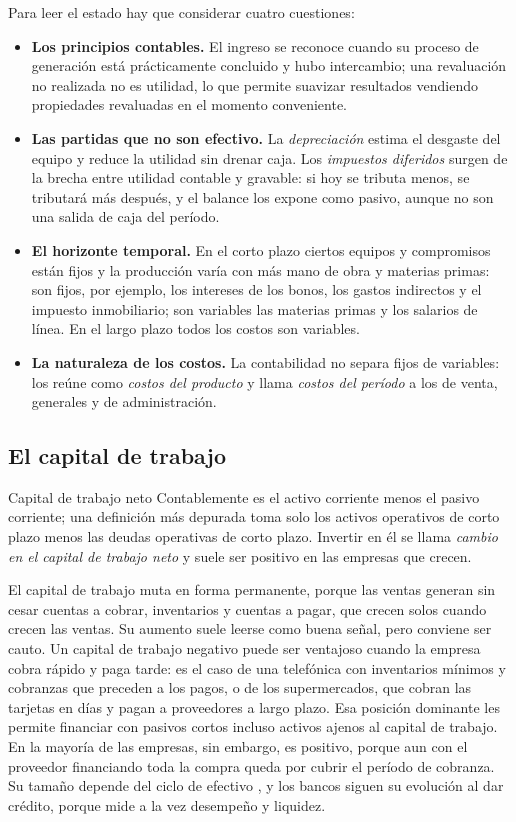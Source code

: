 Para leer el estado hay que considerar cuatro cuestiones:
\begin{itemize}
\item \textbf{Los principios contables.} El ingreso se reconoce cuando su proceso de generación está prácticamente concluido y hubo intercambio; una revaluación no realizada no es utilidad, lo que permite suavizar resultados vendiendo propiedades revaluadas en el momento conveniente.
\item \textbf{Las partidas que no son efectivo.} La \emph{depreciación} estima el desgaste del equipo y reduce la utilidad sin drenar caja. Los \emph{impuestos diferidos} surgen de la brecha entre utilidad contable y gravable: si hoy se tributa menos, se tributará más después, y el balance los expone como pasivo, aunque no son una salida de caja del período.
\item \textbf{El horizonte temporal.} En el corto plazo ciertos equipos y compromisos están fijos y la producción varía con más mano de obra y materias primas: son fijos, por ejemplo, los intereses de los bonos, los gastos indirectos y el impuesto inmobiliario; son variables las materias primas y los salarios de línea. En el largo plazo todos los costos son variables.
\item \textbf{La naturaleza de los costos.} La contabilidad no separa fijos de variables: los reúne como \emph{costos del producto} y llama \emph{costos del período} a los de venta, generales y de administración.
\end{itemize}

\subsection{El capital de trabajo}

\begin{definicion}{Capital de trabajo neto}
Contablemente es el activo corriente menos el pasivo corriente; una definición más depurada toma solo los activos operativos de corto plazo menos las deudas operativas de corto plazo. Invertir en él se llama \emph{cambio en el capital de trabajo neto} y suele ser positivo en las empresas que crecen.
\end{definicion}

El capital de trabajo muta en forma permanente, porque las ventas generan sin cesar cuentas a cobrar, inventarios y cuentas a pagar, que crecen solos cuando crecen las ventas. Su aumento suele leerse como buena señal, pero conviene ser cauto. Un capital de trabajo negativo puede ser ventajoso cuando la empresa cobra rápido y paga tarde: es el caso de una telefónica con inventarios mínimos y cobranzas que preceden a los pagos, o de los supermercados, que cobran las tarjetas en días y pagan a proveedores a largo plazo. Esa posición dominante les permite financiar con pasivos cortos incluso activos ajenos al capital de trabajo. En la mayoría de las empresas, sin embargo, es positivo, porque aun con el proveedor financiando toda la compra queda por cubrir el período de cobranza. Su tamaño depende del ciclo de efectivo , y los bancos siguen su evolución al dar crédito, porque mide a la vez desempeño y liquidez.


